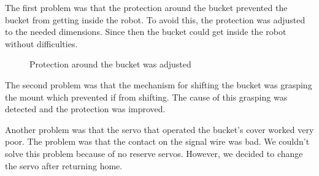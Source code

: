 The first problem was that the protection around the bucket prevented the bucket from getting inside the robot. To avoid this, the protection was adjusted to the needed dimensions. Since then the bucket could get inside the robot without difficulties.

\begin{figure}[H]
	\begin{minipage}[h]{1\linewidth}
		\caption{Protection around the bucket was adjusted}
		\label{Protection0.0}
	\end{minipage}
\end{figure}

The second problem was that the mechanism for shifting the bucket was grasping the mount which prevented if from shifting. The cause of this grasping was detected and the protection was improved. 

Another problem was that the servo that operated the bucket’s cover worked very poor. The problem was that the contact on the signal wire was bad. We couldn’t solve this problem because of no reserve servos. However, we decided to change the servo after returning home.
